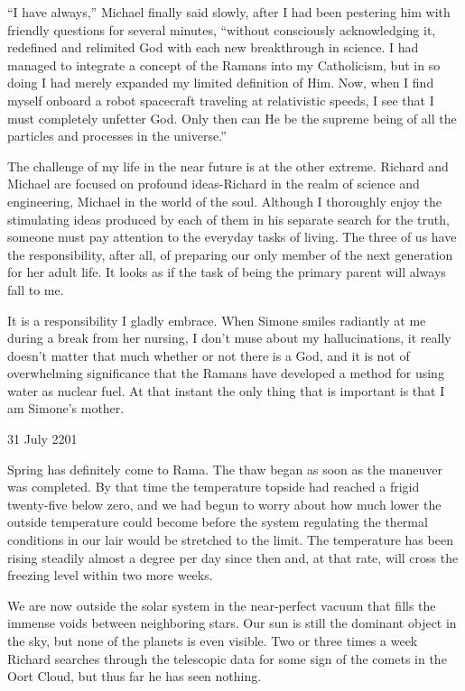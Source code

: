 \documentclass[]{article}
\begin{document}
“I have always,” Michael finally said slowly, after I had been pestering him with friendly questions for several minutes, “without consciously acknowledging it, redefined and relimited God with each new breakthrough in science. I had managed to integrate a concept of the Ramans into my Catholicism, but in so doing I had merely expanded my limited definition of Him. Now, when I find myself onboard a robot spacecraft traveling at relativistic speeds, I see that I must completely unfetter God. Only then can He be the supreme being of all the particles and processes in the universe.”

The challenge of my life in the near future is at the other extreme. Richard and Michael are focused on profound ideas-Richard in the realm of science and engineering, Michael in the world of the soul. Although I thoroughly enjoy the stimulating ideas produced by each of them in his separate search for the truth, someone must pay attention to the everyday tasks of living. The three of us have the responsibility, after all, of preparing our only member of the next generation for her adult life. It looks as if the task of being the primary parent will always fall to me.

It is a responsibility I gladly embrace. When Simone smiles radiantly at me during a break from her nursing, I don’t muse about my hallucinations, it really doesn’t matter that much whether or not there is a God, and it is not of overwhelming significance that the Ramans have developed a method for using water as nuclear fuel. At that instant the only thing that is important is that I am Simone’s mother.

31 July 2201

Spring has definitely come to Rama. The thaw began as soon as the maneuver was completed. By that time the temperature topside had reached a frigid twenty-five below zero, and we had begun to worry about how much lower the outside temperature could become before the system regulating the thermal conditions in our lair would be stretched to the limit. The temperature has been rising steadily almost a degree per day since then and, at that rate, will cross the freezing level within two more weeks.

We are now outside the solar system in the near-perfect vacuum that fills the immense voids between neighboring stars. Our sun is still the dominant object in the sky, but none of the planets is even visible. Two or three times a week Richard searches through the telescopic data for some sign of the comets in the Oort Cloud, but thus far he has seen nothing.
\end{document}
